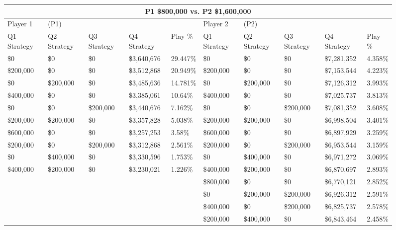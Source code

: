 \documentclass[11pt]{article}
\begin{document}
\begin{figure}
\tiny
\begin{tabular}{ |p{1.0cm}p{1.0cm}p{1.0cm}p{2.0cm}|p{1.0cm}||p{1.0cm}p{1.0cm}p{1.0cm}p{2.0cm}|p{1.0cm}|}
\hline
\multicolumn{10}{|c|}{P1 \$800,000 vs. P2 \$1,600,000} \\
\hline
Player 1 & (P1) & & & & Player 2 & (P2) & & & \\
\hline
Q1 Strategy & Q2 Strategy & Q3 Strategy & Q4 Strategy  &  Play \% & Q1 Strategy & Q2 Strategy & Q3 Strategy & Q4 Strategy  &  Play \%\\
\hline
\$0 & \$0 & \$0 & \$3,640,676 & 29.447\%            & \$0 & \$0 & \$0 & \$7,281,352 & 4.358\% \\
\$200,000 & \$0 & \$0 & \$3,512,868 & 20.949\%      & \$200,000 & \$0 & \$0 & \$7,153,544 & 4.223\% \\
\$0 & \$200,000 & \$0 & \$3,485,636 & 14.781\%      & \$0 & \$200,000 & \$0 & \$7,126,312 & 3.993\% \\
\$400,000 & \$0 & \$0 & \$3,385,061 & 10.64\%       & \$400,000 & \$0 & \$0 & \$7,025,737 & 3.813\% \\
\$0 & \$0 & \$200,000 & \$3,440,676 & 7.162\%       & \$0 & \$0 & \$200,000 & \$7,081,352 & 3.608\% \\
\$200,000 & \$200,000 & \$0 & \$3,357,828 & 5.038\% & \$200,000 & \$200,000 & \$0 & \$6,998,504 & 3.401\% \\
\$600,000 & \$0 & \$0 & \$3,257,253 & 3.58\%        & \$600,000 & \$0 & \$0 & \$6,897,929 & 3.259\% \\
\$200,000 & \$0 & \$200,000 & \$3,312,868 & 2.561\% & \$200,000 & \$0 & \$200,000 & \$6,953,544 & 3.159\% \\
\$0 & \$400,000 & \$0 & \$3,330,596 & 1.753\%       & \$0 & \$400,000 & \$0 & \$6,971,272 & 3.069\% \\
\$400,000 & \$200,000 & \$0 & \$3,230,021 & 1.226\% & \$400,000 & \$200,000 & \$0 & \$6,870,697 & 2.893\% \\
& & & &                                            & \$800,000 & \$0 & \$0 & \$6,770,121 & 2.852\% \\
& & & &                                            & \$0 & \$200,000 & \$200,000 & \$6,926,312 & 2.591\% \\
& & & &                                            & \$400,000 & \$0 & \$200,000 & \$6,825,737 & 2.578\% \\
& & & &                                            & \$200,000 & \$400,000 & \$0 & \$6,843,464 & 2.458\% \\

\end{tabular}
\end{figure}
\end{document}
